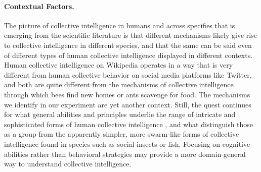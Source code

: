 \documentclass[12pt,letterpaper]{article}
\begin{document}



\paragraph{Contextual Factors.}

The picture of collective intelligence in humans and across specifies that is emerging from the scientific literature is that different mechanisms likely give rise to collective intelligence in different species, and that the same can be said even of different types of human collective intelligence displayed in different contexts.  Human collective intelligence on Wikipedia operates in a way that is very different from human collective behavior on social media platforms like Twitter, and both are quite different from the mechanisms of collective intelligence through which bees find new homes or ants scavenge for food. The mechanisms we identify in our experiment are yet another context. Still, the quest continues for what general abilities and principles underlie the range of intricate and sophisticated forms of human collective intelligence \cite{krafft2019simple}, and what distinguish those as a group from the apparently simpler, more swarm-like forms of collective intelligence found in species such as social insects or fish.  Focusing on cognitive abilities rather than behavioral strategies may provide a more domain-general way to understand collective intelligence.
\end{document}
